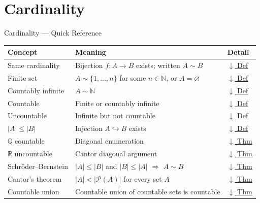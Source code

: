 \section{Cardinality}


\begin{toolkitbox}{Cardinality --- Quick Reference}
\small
\begin{tabular}{l l l}
\toprule
\textbf{Concept} & \textbf{Meaning} & \textbf{Detail} \\
\midrule
Same cardinality     & Bijection $f : A \to B$ exists; written $A \sim B$            & \hyperref[def:same-cardinality]{$\downarrow$ Def} \\
Finite set           & $A \sim \{1,\dots,n\}$ for some $n \in \mathbb{N}$, or $A = \varnothing$ & \hyperref[def:finite-infinite]{$\downarrow$ Def} \\
Countably infinite   & $A \sim \mathbb{N}$                                           & \hyperref[def:countable]{$\downarrow$ Def} \\
Countable            & Finite or countably infinite                                  & \hyperref[def:countable]{$\downarrow$ Def} \\
Uncountable          & Infinite but not countable                                    & \hyperref[def:countable]{$\downarrow$ Def} \\
$|A| \leq |B|$       & Injection $A \hookrightarrow B$ exists                        & \hyperref[def:cardinality-order]{$\downarrow$ Def} \\
$\mathbb{Q}$ countable & Diagonal enumeration                                       & \hyperref[thm:Q-countable]{$\downarrow$ Thm} \\
$\mathbb{R}$ uncountable & Cantor diagonal argument                                & \hyperref[thm:R-uncountable]{$\downarrow$ Thm} \\
Schr\"{o}der--Bernstein  & $|A|\leq|B|$ and $|B|\leq|A|$ $\Rightarrow$ $A \sim B$      & \hyperref[thm:schroder-bernstein]{$\downarrow$ Thm} \\
Cantor's theorem     & $|A| < |\mathcal{P}(A)|$ for every set $A$                   & \hyperref[thm:cantor]{$\downarrow$ Thm} \\
Countable union      & Countable union of countable sets is countable                & \hyperref[thm:countable-union]{$\downarrow$ Thm} \\
\bottomrule
\end{tabular}
\end{toolkitbox}


